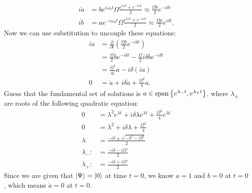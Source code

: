 \documentclass{article}
\begin{document}
\begin{align*}
    i \dot{a} &= b e^{i \omega_0 t} \Omega \frac{e^{i \omega t} + e^{-i \omega t}}{2} \approx \frac{\Omega b}{2} e^{-i \delta t} \\
    i \dot{b} &= a e^{- i \omega_0 t} \Omega \frac{e^{i \omega t} + e^{-i \omega t}}{2} \approx \frac{\Omega a}{2}e^{i \delta t}.
\end{align*}
Now we can use substitution to uncouple these equations:
\begin{align*}
    i \ddot{a} &= \frac{\partial}{\partial t} \left( \frac{\Omega b}{2} e^{-i \delta t} \right) \\
               &= \frac{\Omega}{2} \dot{b}e^{-i \delta t} - \frac{\Omega}{2} i \delta b e^{-i \delta t} \\
               &= \frac{\Omega^2}{4i} a - i \delta (i \dot{a}) \\
    0 &= \ddot{a} + i \delta \dot{a} + \frac{\Omega^2}{4} a.
\end{align*}
Guess that the fundamental set of solutions is $a \in \operatorname{span} \left\{ e^{\lambda_- t}, e^{\lambda_+ t} \right\}$, where $\lambda_\pm$ are roots of the following quadratic equation:
\begin{align*}
    0 &= \lambda^2 e^{\lambda t} + i \delta \lambda e^{\lambda t} + \frac{\Omega^2}{4} e^{\lambda t} \\
    0 &= \lambda^2 + i \delta \lambda + \frac{\Omega^2}{4} \\
    \lambda &= \frac{-i\delta \pm \sqrt{-\delta^2 - \Omega^2}}{2} \\
    \lambda_- :&= \frac{-i\delta -i \Omega'}{2} \\
    \lambda_+ :&= \frac{-i\delta + i \Omega'}{2}
\end{align*}
Since we are given that $\left\lvert \Psi \right\rangle=\left\lvert 0 \right\rangle$ at time $t=0$, we know $a=1$ and $b=0$ at $t=0$, which means $\dot{a}=0$ at $t=0$.
\end{document}

